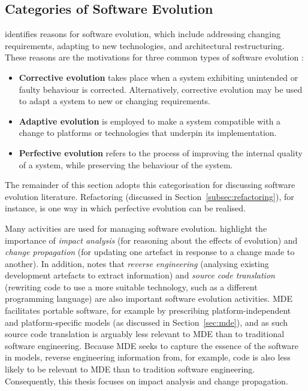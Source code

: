 \subsection{Categories of Software Evolution}
\cite{sjoberg93quantifying} identifies reasons for software evolution, which include addressing changing requirements, adapting to new technologies, and architectural restructuring. These reasons are the motivations for three common types of software evolution \cite[ch. 21]{sommerville06software}:

\begin{itemize}
 \item \textbf{Corrective evolution} takes place when a system exhibiting unintended or faulty behaviour is corrected. Alternatively, corrective evolution may be used to adapt a system to new or changing requirements. 
 \item \textbf{Adaptive evolution} is employed to make a system compatible with a change to platforms or technologies that underpin its implementation.
 \item \textbf{Perfective evolution} refers to the process of improving the internal quality of a system, while preserving the behaviour of the system. 
\end{itemize}

The remainder of this section adopts this categorisation for discussing software evolution literature. Refactoring (discussed in Section~\ref{subsec:refactoring}), for instance, is one way in which perfective evolution can be realised.

Many activities are used for managing software evolution. \cite{winkler09survey} highlight the importance of \emph{impact analysis} (for reasoning about the effects of evolution) and \emph{change propagation} (for updating one artefact in response to a change made to another). In addition, \cite{sommerville06software} notes that \emph{reverse engineering} (analysing existing development artefacts to extract information) and \emph{source code translation} (rewriting code to use a more suitable technology, such as a different programming language) are also important software evolution activities. MDE facilitates portable software, for example by prescribing platform-independent and platform-specific models (as discussed in Section~\ref{sec:mde}), and as such source code translation is arguably less relevant to MDE than to traditional software engineering. Because MDE seeks to capture the essence of the software in models, reverse engineering information from, for example, code is also less likely to be relevant to MDE than to tradition software engineering. Consequently, this thesis focuses on impact analysis and change propagation.

